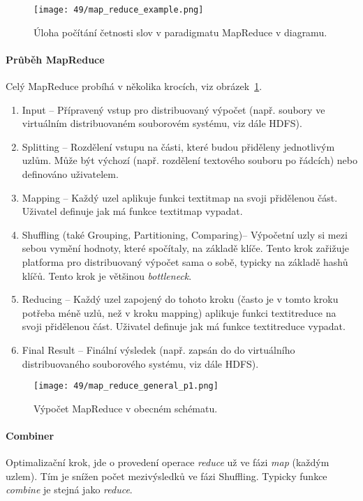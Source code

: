 \begin{figure}[H]
    \centering
    \texttt{[image: 49/map\_reduce\_example.png]}
    \caption{Úloha počítání četnosti slov v paradigmatu MapReduce v diagramu.}
    \label{49_map_reduce_example}
\end{figure}

\paragraph*{Průběh MapReduce} Celý MapReduce probíhá v několika krocích, viz obrázek~\ref{49_map_reduce_example}.
\begin{enumerate}
    \item Input -- Přípravený vstup pro distribuovaný výpočet (např. soubory ve virtuálním distribuovaném souborovém systému, viz dále HDFS).
    \item Splitting -- Rozdělení vstupu na části, které budou přiděleny jednotlivým uzlům. Může být výchozí (např. rozdělení textového souboru po řádcích) nebo definováno uživatelem.
    \item Mapping -- Každý uzel aplikuje funkci textit{map} na svoji přidělenou část. Uživatel definuje jak má funkce textit{map} vypadat.
    \item Shuffling (také Grouping, Partitioning, Comparing)-- Výpočetní uzly si mezi sebou vymění hodnoty, které spočítaly, na základě klíče. Tento krok zařižuje platforma pro distribuovaný výpočet sama o sobě, typicky na základě hashů klíčů. Tento krok je většinou \textit{bottleneck}.
    \item Reducing -- Každý uzel zapojený do tohoto kroku (často je v tomto kroku potřeba méně uzlů, než v kroku mapping) aplikuje funkci textit{reduce} na svoji přidělenou část. Uživatel definuje jak má funkce textit{reduce} vypadat.
    \item Final Result -- Finální výsledek (např. zapsán do do virtuálního distribuovaného souborového systému, viz dále HDFS).
\end{enumerate}

\begin{figure}[H]
    \centering
    \texttt{[image: 49/map\_reduce\_general\_p1.png]}
    \caption{Výpočet MapReduce v obecném schématu.}
\end{figure}

\paragraph*{Combiner} Optimalizační krok, jde o  provedení operace \textit{reduce} už ve fázi \textit{map} (každým uzlem). Tím je snížen počet mezivýsledků ve fázi Shuffling. Typicky funkce \textit{combine} je stejná jako \textit{reduce}.

